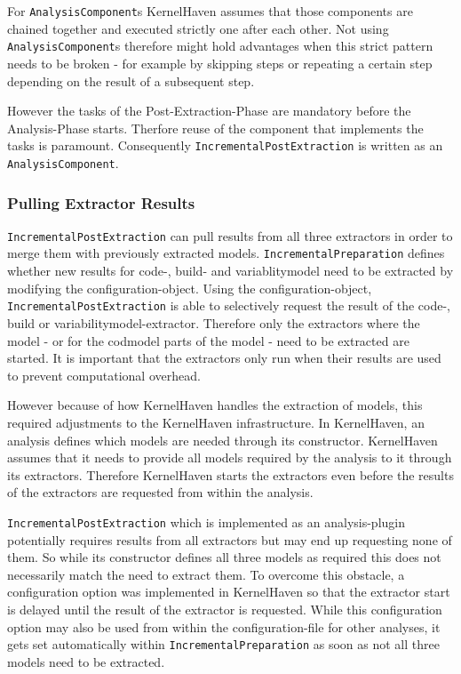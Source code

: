 \documentclass[a4paper]{article}
\begin{document}
For \texttt{AnalysisComponent}s KernelHaven assumes that those components are chained together and executed strictly one after each other. Not using \texttt{AnalysisComponent}s therefore might hold advantages when this strict pattern needs to be broken - for example by skipping steps or repeating a certain step depending on the result of a subsequent step.

However the tasks of the Post-Extraction-Phase are mandatory before the Analysis-Phase starts. Therfore reuse of the component that implements the tasks is paramount. Consequently \texttt{IncrementalPostExtraction} is written as an \texttt{AnalysisComponent}.

\subsubsection{Pulling Extractor Results}

\texttt{IncrementalPostExtraction} can pull results from all three extractors in order to merge them with previously extracted models. \texttt{IncrementalPreparation} defines whether new results for code-, build- and variablitymodel need to be extracted by modifying the configuration-object. Using the configuration-object, \texttt{IncrementalPostExtraction} is able to selectively request the result of the code-, build or variabilitymodel-extractor. Therefore only the extractors where the model - or for the codmodel parts of the model - need to be extracted are started. It is important that the extractors only run when their results are used to prevent computational overhead.

However because of how KernelHaven handles the extraction of models, this required adjustments to the KernelHaven infrastructure. In KernelHaven, an analysis defines which models are needed through its constructor. KernelHaven assumes that it needs to provide all models required by the analysis to it through its extractors. Therefore KernelHaven starts the extractors even before the results of the extractors are requested from within the analysis. 

\texttt{IncrementalPostExtraction} which is implemented as an analysis-plugin potentially requires results from all extractors but may end up requesting none of them. So while its constructor defines all three models as required this does not necessarily match the need to extract them. To overcome this obstacle, a configuration option was implemented in KernelHaven so that the extractor start is delayed until the result of the extractor is requested. While this configuration option may also be used from within the configuration-file for other analyses, it gets set automatically within \texttt{IncrementalPreparation} as soon as not all three models need to be extracted.
\end{document}
